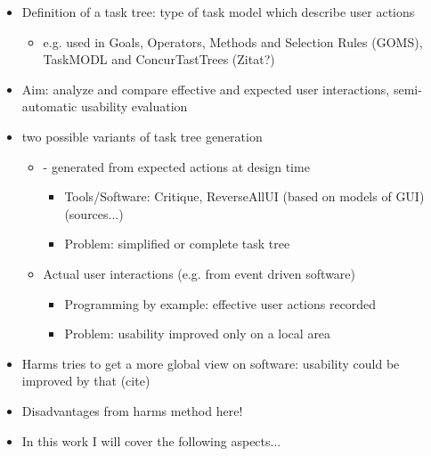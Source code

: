 \begin{itemize}
	\item Definition of a task tree: type of task model which describe user actions
    	\begin{itemize}
		\item  e.g. used in Goals, Operators, Methods and Selection Rules (GOMS), TaskMODL and ConcurTastTrees (Zitat?)
	\end{itemize}
	\item Aim: analyze and compare effective and expected user interactions, semi-automatic usability evaluation
	\item two possible variants of task tree generation 
 	\begin{itemize}
		\item - generated from expected actions at design time
      		\begin{itemize}
			\item Tools/Software: Critique, ReverseAllUI (based on models of GUI) (sources...)
      			\item Problem: simplified or complete task tree
		\end{itemize}
		\item Actual user interactions (e.g. from event driven software)
     		\begin{itemize} 
			\item Programming by example: effective user actions recorded
			\item Problem: usability improved only on a local area
		\end{itemize}
	\end{itemize}
	\item Harms tries to get a more global view on software: usability could be improved by that (cite) \citep{harms2013}
	\item Disadvantages from harms method here!
	\item In this work I will cover the following aspects...
\end{itemize}


